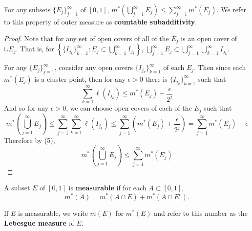 \begin{pblm}%
	For any subsets $\{E_j\}_{j=1}^\infty$ of $[0,1]$, 
	$m^\ast\left(\bigcup\limits_{j=1}^\infty E_j\right) \le 
	\sum\limits_{j=1}^\infty m^\ast (E_j).$
	We refer to this property of outer measure as 
	\textbf{countable subadditivity}.
\begin{proof}
	Note that for any set of open covers of all of the $E_j$ is an open cover of $\cup E_j$. That is, for 
	$\left\{ \{I_{j_k}\}_{k=1}^\infty: E_j \subset \bigcup\limits_{k=1}^\infty I_{j_k}\right\}$, 
	$\bigcup\limits_{j=1}^\infty E_j \subset \bigcup\limits_{j=1}^\infty\bigcup\limits_{k=1}^\infty I_{j_k}.$ 

	For any $\{E_j\}_{j=1}^\infty$, consider any open covers $\{I_{j_k}\}_{k=1}^\infty$ 
	of each $E_j$. Then since each $m^\ast(E_j)$ is a cluster point, then for any $\epsilon > 0$ 
	there is $\{I_{j_k}\}_{k=1}^\infty$ such that 
	\begin{equation*}
		\sum\limits_{k=1}^\infty \ell(I_{j_k}) \le m^\ast(E_j) + \frac{\epsilon}{2^j}
	\end{equation*}
	And so for any $\epsilon > 0$, we can choose open covers of each of the $E_j$ such that 
	\begin{equation*}
		m^\ast\left(\bigcup\limits_{j=1}^\infty E_j\right) \le 
		\sum\limits_{j=1}^\infty\sum\limits_{k=1}^\infty \ell(I_{j_k}) \le 
		\sum\limits_{j=1}^\infty \left(m^\ast(E_j)+ \frac{\epsilon}{2^j}\right) = 
		\sum\limits_{j=1}^\infty m^\ast(E_j) + \epsilon
	\end{equation*}
	Therefore by (5), 
	\begin{equation*}
		m^\ast\left(\bigcup\limits_{j=1}^\infty E_j\right) \le \sum\limits_{j=1}^\infty m^\ast(E_j)
	\end{equation*}
\end{proof}
\end{pblm}

\begin{defn}\label{d:measurable}%
	A subset $E$ of $[0,1]$ is \textbf{measurable} if for 
	each $A \subset [0,1]$, 
	\begin{equation*}
		m^\ast(A) = m^\ast(A\cap E) + m^\ast(A\cap E^c). 
	\end{equation*}
\end{defn}

\begin{notation}%
	If $E$ is measurable, we write $m(E)$ for $m^\ast(E)$ and refer to 
	this number as the \textbf{Lebesgue measure} of $E$. 
\end{notation}

